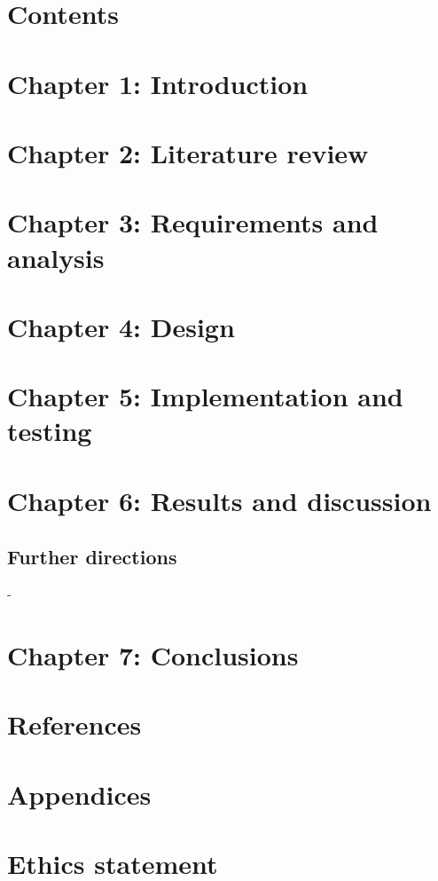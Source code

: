 \documentclass{article}
\begin{document}
\newpage

\section{Contents}
\tableofcontents
\blindtext
\newpage

\section{Chapter 1: Introduction}
\blindtext
\newpage

\section{Chapter 2: Literature review}
\blindtext
\newpage

\section{Chapter 3: Requirements and analysis}
\blindtext
\newpage

\section{Chapter 4: Design}
\blindtext
\newpage

\section{Chapter 5: Implementation and testing}
\blindtext
\newpage

\section{Chapter 6: Results and discussion}

\blindtext

\subsection*{Further directions}
- 

\newpage

\section{Chapter 7: Conclusions}
\blindtext
\newpage

\section{References}
\blindtext
\newpage

\section{Appendices}
\blindtext
\newpage

\section{Ethics statement}
\blindtext
\newpage
\end{document}
